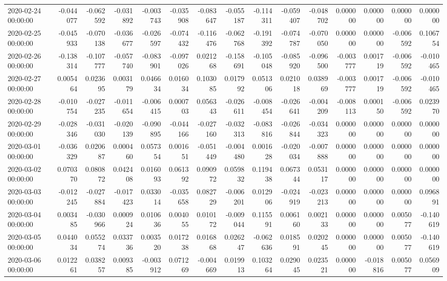 \begin{tabular}{lrrrrrrrrrrrrrr}
2020-02-24 00:00:00 & -0.044077 & -0.062592 & -0.031892 & -0.003743 & -0.035908 & -0.083647 & -0.055187 & -0.114311 & -0.059407 & -0.048702 & 0.000000 & 0.000000 & 0.000000 & 0.000000 \\
2020-02-25 00:00:00 & -0.045933 & -0.070138 & -0.036677 & -0.026597 & -0.074432 & -0.116476 & -0.062768 & -0.191392 & -0.074787 & -0.070050 & 0.000000 & 0.000000 & -0.006592 & 0.106754 \\
2020-02-26 00:00:00 & -0.138314 & -0.107777 & -0.057740 & -0.083901 & -0.097026 & 0.021268 & -0.158691 & -0.105048 & -0.085920 & -0.096500 & -0.003777 & 0.001719 & -0.006592 & -0.010465 \\
2020-02-27 00:00:00 & 0.005464 & 0.023695 & 0.003179 & 0.046634 & 0.016034 & 0.103085 & 0.017992 & 0.051306 & 0.021018 & 0.038969 & -0.003777 & 0.001719 & -0.006592 & -0.010465 \\
2020-02-28 00:00:00 & -0.010754 & -0.027235 & -0.011654 & -0.006415 & 0.000703 & 0.056343 & -0.026611 & -0.008454 & -0.026641 & -0.004209 & -0.008113 & 0.000150 & -0.006592 & 0.023970 \\
2020-02-29 00:00:00 & -0.028346 & -0.031030 & -0.020139 & -0.090895 & -0.044166 & -0.027160 & -0.032313 & -0.083816 & -0.026844 & -0.034323 & 0.000000 & 0.000000 & 0.000000 & 0.000000 \\
2020-03-01 00:00:00 & -0.036329 & 0.020687 & 0.000460 & 0.057354 & 0.001651 & -0.051449 & -0.004480 & 0.001628 & -0.020034 & -0.007888 & 0.000000 & 0.000000 & 0.000000 & 0.000000 \\
2020-03-02 00:00:00 & 0.070370 & 0.080872 & 0.042408 & 0.016093 & 0.061392 & 0.090972 & 0.059832 & 0.119438 & 0.067344 & 0.053117 & 0.000000 & 0.000000 & 0.000000 & 0.000000 \\
2020-03-03 00:00:00 & -0.012245 & -0.027884 & -0.017423 & 0.033014 & -0.035658 & 0.082729 & -0.006201 & 0.012906 & -0.024919 & -0.023213 & 0.000000 & 0.000000 & 0.000000 & 0.096891 \\
2020-03-04 00:00:00 & 0.003485 & -0.030966 & 0.000924 & 0.010636 & 0.004055 & 0.010172 & -0.009044 & 0.115591 & 0.006160 & 0.002133 & 0.000000 & 0.000000 & 0.005077 & -0.140619 \\
2020-03-05 00:00:00 & 0.044034 & 0.055274 & 0.033736 & 0.003520 & 0.017238 & 0.016868 & 0.026247 & -0.062636 & 0.018591 & 0.020245 & 0.000000 & 0.000000 & 0.005077 & -0.140619 \\
2020-03-06 00:00:00 & 0.012261 & 0.038257 & 0.009385 & -0.003912 & 0.071269 & -0.004669 & 0.019913 & 0.103264 & 0.029045 & 0.023521 & 0.000000 & -0.018816 & 0.005077 & 0.056909 \\

\end{tabular}
